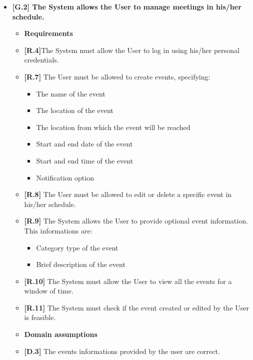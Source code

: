 \begin{itemize}
	\item \textbf{[G.2] The System allows the User to manage meetings in his/her schedule.}
	\begin{itemize}
		\item [] \textbf{Requirements}
		\item \textbf{[R.4]}The System must allow the User to log in using his/her personal credentials.
		\item \textbf{[R.7]} The User must be allowed to create events, specifying:
		\begin{itemize}
			\item The name of the event
			\item The location of the event
			\item The location from which the event will be reached
			\item Start and end date of the event
			\item Start and end time of the event
			\item Notification option
		\end{itemize}
		\item \textbf{[R.8]} The User must be allowed to edit or delete a specific event in his/her schedule.
		\item \textbf{[R.9]} The System allows the User to provide optional event information. This informations are:
		\begin{itemize}
			\item Category type of the event
			\item Brief description of the event
		\end{itemize}
		\item \textbf{[R.10]} The System must allow the User to view all the events for a window of time.
		\item \textbf{[R.11]} The System must check if the event created or edited by the User is feasible.
		\item [] \textbf{Domain assumptions}
		\item \textbf{[D.3]} The events informations provided by the user are correct.
	\end{itemize}


\end{itemize}

